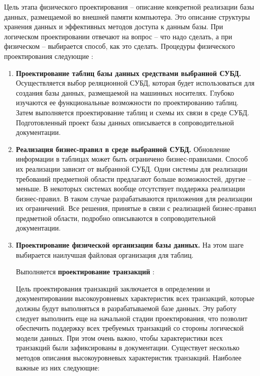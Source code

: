 Цель этапа физического проектирования – описание конкретной реализации базы данных, размещаемой во внешней
памяти компьютера. Это описание структуры хранения данных и эффективных методов доступа к данным базы. При
логическом проектировании отвечают на вопрос – что надо сделать, а при физическом – выбирается способ, как
это сделать. Процедуры физического проектирования следующие \autocite{oscerko}:
\begin{enumerate}
    \item \textbf{Проектирование таблиц базы данных средствами выбранной СУБД.}
        Осуществляется выбор реляционной СУБД, которая будет использоваться для создания базы данных,
        размещаемой на машинных носителях. Глубоко изучаются ее функциональные возможности по проектированию
        таблиц. Затем выполняется проектирование таблиц и схемы их связи в среде СУБД. Подготовленный проект
        базы данных описывается в сопроводительной документации.

    \item \textbf{Реализация бизнес-правил в среде выбранной СУБД.}
        Обновление информации в таблицах может быть ограничено бизнес-правилами. Способ их реализации
        зависит от выбранной СУБД. Одни системы для реализации требований предметной области предлагают
        больше возможностей, другие – меньше. В некоторых системах вообще отсутствует поддержка реализации
        бизнес-правил. В таком случае разрабатываются приложения для реализации их ограничений. Все решения,
        принятые в связи с реализацией бизнес-правил предметной области, подробно описываются в сопроводительной
        документации.

    \item \textbf{Проектирование физической организации базы данных.}
        На этом шаге выбирается наилучшая файловая организация для таблиц. 
        
        Выполняется \textbf{проектирование транзакций} \autocite{koch}:
        
        Цель проектирования транзакций заключается в определении и
        документировании высокоуровневых характеристик всех транзакций,
        которые должны будут выполняться в разрабатываемой базе данных. Эту
        работу следует выполнить еще на начальной стадии проектирования, что
        позволит обеспечить поддержку всех требуемых транзакций со стороны
        логической модели данных. При этом очень важно, чтобы характеристики
        всех транзакций были зафиксированы в документации. Существует
        несколько методов описания высокоуровневых характеристик транзакций.
        Наиболее важные из них следующие:
        

\end{enumerate}
